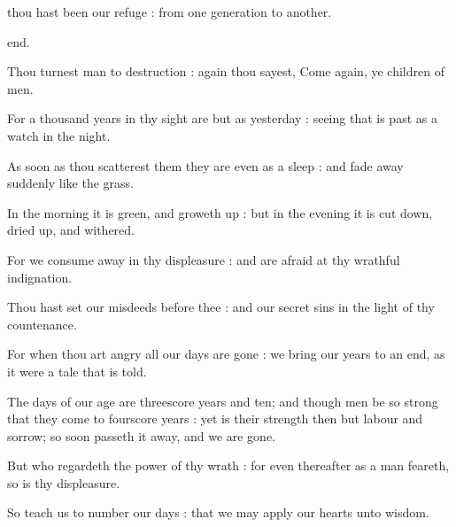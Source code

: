 thou hast been our refuge : from one generation to another.\par
\noindent
end.\par
{}Thou turnest man to destruction : again thou sayest, Come again, ye children of men.\par
{}For a thousand years in thy sight are but as yesterday : seeing that is past as a watch in the night.\par
{}As soon as thou scatterest them they are even as a sleep : and fade away suddenly like the grass.\par
{}In the morning it is green, and groweth up : but in the evening it is cut down, dried up, and withered.\par
{}For we consume away in thy displeasure : and are afraid at thy wrathful indignation.\par
{}Thou hast set our misdeeds before thee : and our secret sins in the light of thy countenance.\par
{}For when thou art angry all our days are gone : we bring our years to an end, as it were a tale that is told.\par
{}The days of our age are threescore years and ten; and though men be so strong that they come to fourscore years : yet is their strength then but labour and sorrow; so soon passeth it away, and we are gone.\par
{}But who regardeth the power of thy wrath : for even thereafter as a man feareth, so is thy displeasure.\par
{}So teach us to number our days : that we may apply our hearts unto wisdom.\par

